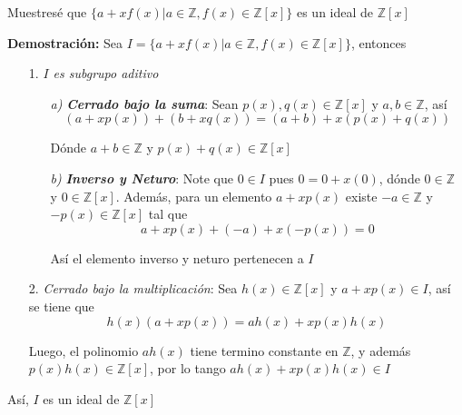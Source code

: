 Muestresé que $\{a + xf(x) | a \in \mathbb{Z}, f(x) \in \mathbb{Z}[x]\}$ es un ideal de $\mathbb{Z}[x]$

\textbf{Demostración:} Sea $I = \{a + xf(x) | a \in \mathbb{Z}, f(x) \in \mathbb{Z}[x]\}$, entonces
\begin{itemize}
    \item [1.] \textit{$I$ es subgrupo aditivo}

    \begin{itemize}
        \item [\textit{a)}] \textbf{\textit{Cerrado bajo la suma}}: Sean $p(x),q(x)\in\mathbb{Z}[x]$ y $a,b\in\mathbb{Z}$, así
        $$(a +xp(x)) + (b + xq(x)) = (a+b) + x(p(x) + q(x))$$

        Dónde $a+b\in \mathbb{Z}$ y $p(x) + q(x) \in \mathbb{Z}[x]$ \smallskip

        \item [\textit{b)}] \textbf{\textit{Inverso y Neturo}}: Note que $0 \in I$ pues $0 = 0 + x(0)$, dónde $0 \in \mathbb{Z}$ y $0 \in \mathbb{Z}[x]$. Además, para un elemento $a + xp(x)$ existe $-a\in \mathbb{Z}$ y $-p(x) \in \mathbb{Z}[x]$ tal que
        $$a + xp(x) + (-a) + x(-p(x)) = 0$$

        Así el elemento inverso y neturo pertenecen a $I$
    \end{itemize}

    \item [2.] \textit{Cerrado bajo la multiplicación}: Sea $h(x)\in \mathbb{Z}[x]$ y $a + xp(x)\in I$, así se tiene que
    $$h(x)(a+xp(x)) = ah(x) + xp(x)h(x)$$

    Luego, el polinomio $ah(x)$ tiene termino constante en $\mathbb{Z}$, y además $p(x)h(x) \in \mathbb{Z}[x]$, por lo tango $ah(x) + xp(x)h(x) \in I$        
\end{itemize}

Así, $I$ es un ideal de $\mathbb{Z}[x]$